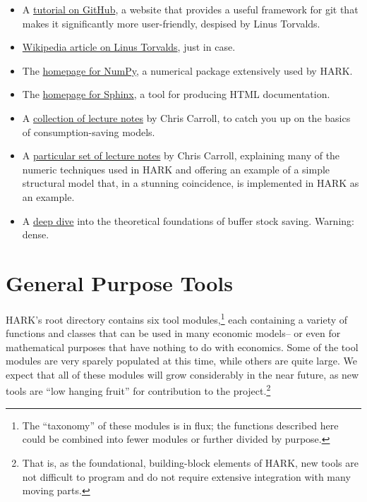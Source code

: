 \documentclass[12pt,titlepage,letterpaper]{econtex}
\begin{document}
{\begin{itemize}
\item A \href{https://guides.github.com/activities/hello-world/}{tutorial on GitHub}, a website that provides a useful framework for git that makes it significantly more user-friendly, despised by Linus Torvalds.

\item \href{https://en.wikipedia.org/wiki/Linus_Torvalds}{Wikipedia article on Linus Torvalds}, just in case.

\item The \href{http://www.numpy.org/}{homepage for NumPy}, a numerical package extensively used by HARK.

\item The \href{http://www.sphinx-doc.org/}{homepage for Sphinx}, a tool for producing HTML documentation.

\item A \href{http://www.econ2.jhu.edu/people/ccarroll/public/lecturenotes/Consumption/}{collection of lecture notes} by Chris Carroll, to catch you up on the basics of consumption-saving models.

\item A \href{http://www.econ2.jhu.edu/people/ccarroll/SolvingMicroDSOPs/}{particular set of lecture notes} by Chris Carroll, explaining many of the numeric techniques used in HARK and offering an example of a simple structural model that, in a stunning coincidence, is implemented in HARK as an example.

\item A \href{http://www.econ2.jhu.edu/people/ccarroll/BufferStockTheory.pdf}{deep dive} into the theoretical foundations of buffer stock saving.  Warning: dense.

\end{itemize}


\section{General Purpose Tools}\label{sec:GeneralPurposeTools}

HARK's root directory contains six tool modules,\footnote{The ``taxonomy'' of these modules is in flux; the functions described here could be combined into fewer modules or further divided by purpose.} each containing a variety of functions and classes that can be used in many economic models-- or even for mathematical purposes that have nothing to do with economics.  Some of the tool modules are very sparely populated at this time, while others are quite large.  We expect that all of these modules will grow considerably in the near future, as new tools are ``low hanging fruit'' for contribution to the project.\footnote{That is, as the foundational, building-block elements of HARK, new tools are not difficult to program and do not require extensive integration with many moving parts.}

}
\end{document}
